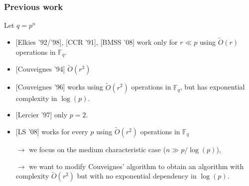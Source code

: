 \documentclass[10pt,a4paper]{beamer}
\theoremstyle{plain}
\theoremstyle{definition}
\theoremstyle{definition}
\theoremstyle{definition}
\theoremstyle{definition}
\theoremstyle{remark}
\theoremstyle{remark}
\begin{document}
\begin{frame}
\frametitle{Previous work}

Let $q=p^n$

\begin{itemize}
\item{} [Elkies '92/'98],  [CCR '91], [BMSS '08] work only for $r \ll p$ using $\tilde{O}(r)$ operations in $\mathbb{F}_q$.
\item{} [Couveignes '94] $\tilde{O}(r^3)$
\item{} [Couveignes '96] works using $\tilde{O}(r^2)$ operations in $\mathbb{F}_q$, but has exponential complexity in $\log(p)$.
\item{} [Lercier '97] only $p=2$.
\item{} [LS '08] works for every $p$ using $\tilde{O}(r^2)$ operations in $\mathbb{F}_q$
\end{itemize}
\begin{itemize}

\item[$\rightarrow$] we focus on the medium characteristic case ($n\gg p/\log(p)$),

\item[$\rightarrow$] we want to modify Couveignes' algorithm to obtain an algorithm with complexity $\tilde{O}(r^2)$ but with no exponential dependency in $\log(p)$.

\end{itemize}
\end{frame}
\end{document}
